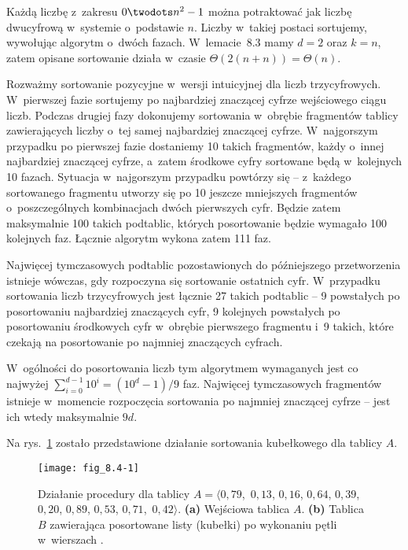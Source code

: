 \exercise %
Każdą liczbę z~zakresu $0\twodots n^2-1$ można potraktować jak liczbę dwucyfrową w~systemie o~podstawie $n$. Liczby w~takiej postaci sortujemy, wywołując algorytm  o~dwóch fazach. W~lemacie~8.3 mamy $d=2$ oraz $k=n$, zatem opisane sortowanie działa w~czasie $\Theta(2(n+n))=\Theta(n)$.

\exercise %
Rozważmy sortowanie pozycyjne w~wersji intuicyjnej dla liczb trzycyfrowych. W~pierwszej fazie sortujemy po najbardziej znaczącej cyfrze wejściowego ciągu liczb. Podczas drugiej fazy dokonujemy sortowania w~obrębie fragmentów tablicy zawierających liczby o~tej samej najbardziej znaczącej cyfrze. W~najgorszym przypadku po pierwszej fazie dostaniemy 10 takich fragmentów, każdy o~innej najbardziej znaczącej cyfrze, a~zatem środkowe cyfry sortowane będą w~kolejnych 10 fazach. Sytuacja w~najgorszym przypadku powtórzy się -- z~każdego sortowanego fragmentu utworzy się po 10 jeszcze mniejszych fragmentów o~poszczególnych kombinacjach dwóch pierwszych cyfr. Będzie zatem maksymalnie 100 takich podtablic, których posortowanie będzie wymagało 100 kolejnych faz. Łącznie algorytm wykona zatem 111 faz. 

Najwięcej tymczasowych podtablic pozostawionych do późniejszego przetworzenia istnieje wówczas, gdy rozpoczyna się sortowanie ostatnich cyfr. W~przypadku sortowania liczb trzycyfrowych jest łącznie 27 takich podtablic -- 9 powstałych po posortowaniu najbardziej znaczących cyfr, 9 kolejnych powstałych po posortowaniu środkowych cyfr w~obrębie pierwszego fragmentu i~9 takich, które czekają na posortowanie po najmniej znaczących cyfrach.

W~ogólności do posortowania liczb  tym algorytmem wymaganych jest co najwyżej $\sum_{i=0}^{d-1}10^i=(10^d-1)/9$ faz. Najwięcej tymczasowych fragmentów istnieje w~momencie rozpoczęcia sortowania po najmniej znaczącej cyfrze -- jest ich wtedy maksymalnie $9d$.


\exercise %
Na rys.~\ref{fig:8.4-1} zostało przedstawione działanie sortowania kubełkowego dla tablicy $A$.
\begin{figure}[ht]
	\begin{center}
		\texttt{[image: fig\_8.4-1]}
	\end{center}
	\caption{Działanie procedury  dla tablicy $A=\langle0{,}79$,~$0{,}13$, $0{,}16$, $0{,}64$, $0{,}39$, $0{,}20$, $0{,}89$, $0{,}53$,\! $0{,}71$,\!~$0{,}42\rangle$. {\sffamily\bfseries(a)} Wejściowa tablica $A$. {\sffamily\bfseries(b)} Tablica $B$ zawierająca posortowane listy (kubełki) po wykonaniu pętli w~wierszach .} \label{fig:8.4-1}
\end{figure}

